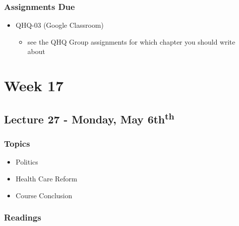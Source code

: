 \documentclass[]{book}
\providecommand{\tightlist}{%
  \setlength{\itemsep}{0pt}\setlength{\parskip}{0pt}}
\begin{document}
\hypertarget{assignments-due-8}{%
\subsubsection*{Assignments Due}\label{assignments-due-8}}

\begin{itemize}
\tightlist
\item
  QHQ-03 (Google Classroom)

  \begin{itemize}
  \tightlist
  \item
    see the QHQ Group assignments for which chapter you should write about
  \end{itemize}
\end{itemize}

\hypertarget{week-17}{%
\section*{Week 17}\label{week-17}}

\hypertarget{lecture-27---monday-may-6thth}{%
\subsection*{\texorpdfstring{Lecture 27 - Monday, May 6th\textsuperscript{th}}{Lecture 27 - Monday, May 6thth}}\label{lecture-27---monday-may-6thth}}

\hypertarget{topics-31}{%
\subsubsection*{Topics}\label{topics-31}}

\begin{itemize}
\tightlist
\item
  Politics
\item
  Health Care Reform
\item
  Course Conclusion
\end{itemize}

\hypertarget{readings-29}{%
\subsubsection*{Readings}\label{readings-29}}
\end{document}
